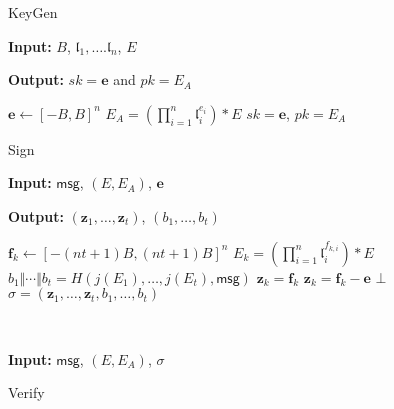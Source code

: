 \documentclass{llncs}
\newcommand{\msg}{\textsf{msg}}
\renewcommand{\a}{\mathfrak{a}}
\renewcommand{\b}{\mathfrak{b}}
\renewcommand{\l}{\mathfrak{l}}
\newcommand{\e}{\textbf{e}}
\newcommand{\f}{\textbf{f}}
\newcommand{\z}{\textbf{z}}
\begin{document}



%
%

\begin{figure}
\begin{minipage}{.45\textwidth}
\begin{algorithm}[H]
	\caption{KeyGen \label{alg:KeyGen}}
	\textbf{Input:} $B$, $\l_1, \dots. \l_n$, $E$

	\textbf{Output:} $sk =\e$ and $pk = E_A$

	\begin{algorithmic}[1]
		\State $\e \leftarrow [-B,B]^n$ 
		\State $E_A = ( \prod_{i=1}^n \l_i^{e_i} ) * E$
		\State \Return $sk= \e$, $pk = E_A$
	\end{algorithmic}
\end{algorithm}

\vskip -1.2cm

\begin{algorithm}[H]
	\caption{Sign \label{alg:Sign}}
	\textbf{Input:} $\msg$, $(E,E_A)$, $\e$

	\textbf{Output:} $(\z_1, \dots, \z_t)$, $(b_1 , \dots, b_t)$

	\begin{algorithmic}[1]
		\State $\f_k \leftarrow [-(nt+1)B,(nt+1)B]^n$ 
		\State $E_k = ( \prod_{i=1}^n \l_i^{f_{k,i}} ) * E$
		\EndFor
		\State $b_1 \Vert \cdots \Vert b_t = H( j(E_1) , \dots, j(E_t), \msg )$
		\State $\z_k = \f_k$
		\Else
		\State $\z_k = \f_k - \e$
		\EndIf
		\If{$\z_{k} \not\in [-ntB,ntB]^n$} \State \Return $\bot$ \EndIf
		\EndFor
		\State \Return $\sigma = (\z_1, \dots, \z_t, b_1 , \dots, b_t)$
	\end{algorithmic}
\end{algorithm}
\end{minipage}
 \ \ \ \ \ \ \ \ \ \ \ \ 
\begin{minipage}{0.45\textwidth}
\begin{algorithm}[H]
	\caption{Verify \label{alg:Verify}}
	\textbf{Input:} $\msg$, $(E,E_A)$, $\sigma$


\end{algorithm}
\end{minipage}
\end{figure}
\end{document}
